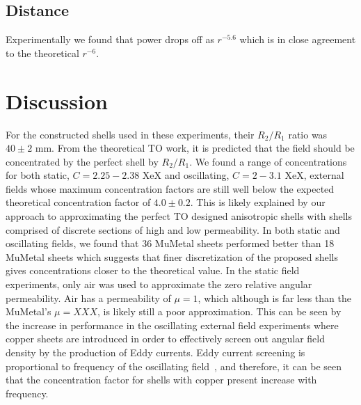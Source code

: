 \documentclass[11pt]{iopart}
\begin{document}

\subsection{Distance}
Experimentally we found that power drops off as $r^{-5.6}$ which is in
close agreement to the theoretical $r^{-6}$.\\

\section{Discussion}

For the constructed shells used in these experiments, their $R_2/R_1$
ratio was $40 \pm 2$ mm. From the theoretical TO work, it is predicted
that the field should be concentrated by the perfect shell by
$R_2/R_1$. We found a range of concentrations for both static, $C =
2.25 - 2.38$ XeX and oscillating, $C = 2 - 3.1$ XeX, external fields
whose maximum concentration factors are still well below the expected
theoretical concentration factor of $4.0 \pm 0.2$. This is likely
explained by our approach to approximating the perfect TO designed
anisotropic shells with shells comprised of discrete sections of high
and low permeability.  In both static and oscillating fields, we found
that 36 MuMetal sheets performed better than 18 MuMetal sheets which
suggests that finer discretization of the proposed shells gives
concentrations closer to the theoretical value. In the static field
experiments, only air was used to approximate the zero relative
angular permeability. Air has a permeability of $\mu = 1$, which
although is far less than the MuMetal's $\mu = XXX$, is likely still a
poor approximation. This can be seen by the increase in performance in
the oscillating external field experiments where copper sheets are
introduced in order to effectively screen out angular field density by
the production of Eddy currents. Eddy current screening is
proportional to frequency of the oscillating field~\cite{XXX}, and
therefore, it can be seen that the concentration factor for shells
with copper present increase with frequency. \\
\end{document}
